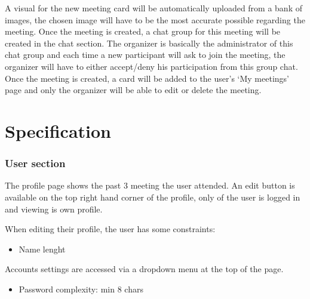 \documentclass[conference]{IEEEtran}
\begin{document}
A visual for the new meeting card will be automatically uploaded from a bank of images, the chosen image will have to be the most accurate possible regarding the meeting.
Once the meeting is created, a chat group for this meeting will be created in the chat section. The organizer is basically the administrator of this chat group and each time a new participant will ask to join the meeting, the organizer will
have to either accept/deny his participation from this group chat.
Once the meeting is created, a card will be added to the user’s ‘My meetings’ page and only the organizer will be able to edit or delete the meeting.

\section{Specification}

\subsubsection{User section}

The profile page shows the past 3 meeting the user attended. An edit button is available on the top right hand corner of the profile, only of the user is logged in and viewing is own profile.

When editing their profile, the user has some constraints:

\begin{itemize}
    \item Name lenght
\end{itemize}

Accounts settings are accessed via a dropdown menu at the top of the page.

\begin{itemize}
    \item Password complexity: min 8 chars
\end{itemize}
\end{document}
